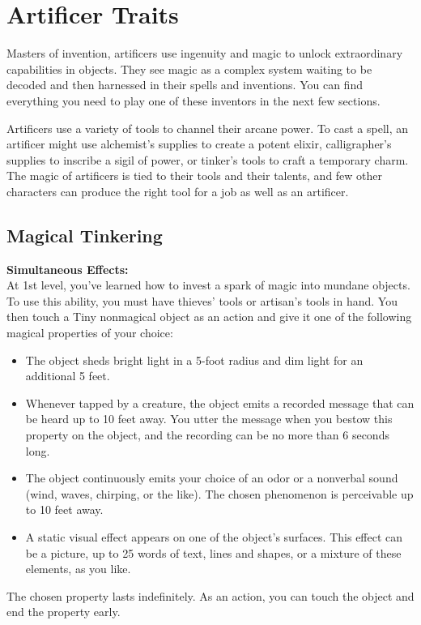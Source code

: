 \documentclass[letterpaper,openany,oneside,twocolumn]{book}
\begin{document}
\section*{Artificer Traits}
Masters of invention, artificers use ingenuity and magic to unlock extraordinary capabilities in objects. They see magic as a complex system waiting to be decoded and then harnessed in their spells and inventions. You can find everything you need to play one of these inventors in the next few sections.

Artificers use a variety of tools to channel their arcane power. To cast a spell, an artificer might use alchemist's supplies to create a potent elixir, calligrapher's supplies to inscribe a sigil of power, or tinker's tools to craft a temporary charm. The magic of artificers is tied to their tools and their talents, and few other characters can produce the right tool for a job as well as an artificer.
\subsection*{Magical Tinkering}
\textbf{Simultaneous Effects: }\\
At 1st level, you've learned how to invest a spark of magic into mundane objects. To use this ability, you must have thieves' tools or artisan's tools in hand. You then touch a Tiny nonmagical object as an action and give it one of the following magical properties of your choice:
\begin{itemize}
	\item The object sheds bright light in a 5-foot radius and dim light for an additional 5 feet.
	\item Whenever tapped by a creature, the object emits a recorded message that can be heard up to 10 feet away. You utter the message when you bestow this property on the object, and the recording can be no more than 6 seconds long.
	\item The object continuously emits your choice of an odor or a nonverbal sound (wind, waves, chirping, or the like). The chosen phenomenon is perceivable up to 10 feet away.
	\item A static visual effect appears on one of the object's surfaces. This effect can be a picture, up to 25 words of text, lines and shapes, or a mixture of these elements, as you like.
\end{itemize}
The chosen property lasts indefinitely. As an action, you can touch the object and end the property early.
\end{document}
